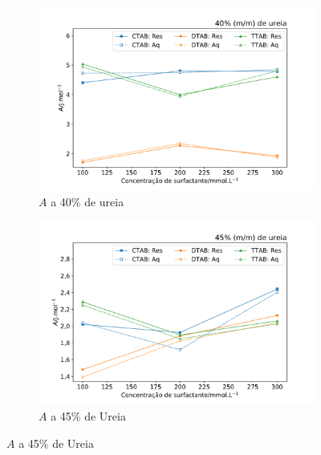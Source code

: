 \begin{figure}[H]
		 	\begin{subfigure}[t]{0.45\textwidth}
		 		\includegraphics[width=\textwidth]{./imagens/dsc/A_40p_1_300_aq_res}
		 		\caption{$A$ a 40\% de ureia}
		 		\label{fig:DSC_A_40pUr}
		 	\end{subfigure} \qquad %
		 	\begin{subfigure}[t]{0.45\textwidth}
		 		\includegraphics[width=\textwidth]{./imagens/dsc/A_45p_1_300_aq_res}
		 		\caption{$A$ a 45\% de Ureia}
		 		\label{fig:DSC_A_45pUr}
		 	\end{subfigure}
	 	

\end{figure}

